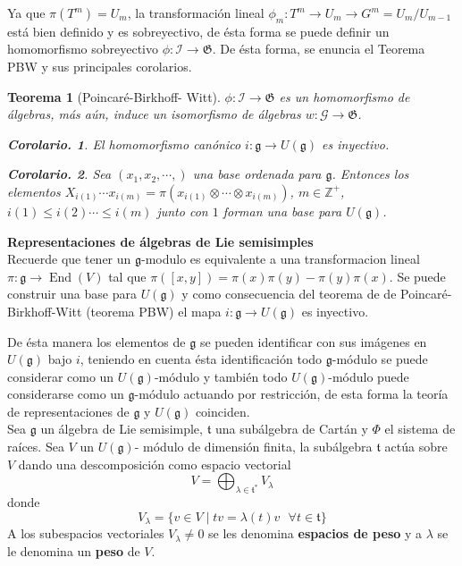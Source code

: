 \documentclass[11pt,a4paper]{article}
\newtheorem{corolary}{Corolario.}
\newtheorem{theorem}{Teorema}
\newcommand{\mfg}{\mathfrak{g}}
\newcommand{\suchthat}{\mid}
\newcommand{\End}{\mathop{End}}
\begin{document}
Ya que $\pi(T^m)= U_m$, la transformación lineal $\phi_m: T^m \rightarrow U_m \rightarrow G^m= U_m /U_{m-1}$ está bien definido y es sobreyectivo, de ésta forma se puede definir un homomorfismo sobreyectivo $\phi: \mathcal{I}\rightarrow \mathfrak{G}$. De ésta forma, se enuncia el Teorema PBW y sus principales corolarios.
\begin{theorem}[Poincaré-Birkhoff- Witt] $\phi: \mathcal{I} \rightarrow \mathfrak{G}$ es un homomorfismo de álgebras, más aún, induce un isomorfismo de álgebras $w: \mathcal{G}\rightarrow \mathfrak{G}$.
\begin{corolary}
El homomorfismo canónico $i: \mfg \rightarrow U(\mfg)$ es inyectivo.
\end{corolary}
\begin{corolary}
Sea $(x_1, x_2, \cdots, )$ una base ordenada para $\mfg$. Entonces los elementos $X_{i(1)}\cdots x_{i(m)}= \pi (x_{i(1)}\otimes \cdots \otimes x_{i(m)})$, $m\in \mathbb{Z}^+$, $i(1)\leq i(2) \cdots \leq i(m)$ junto con $1$ forman una base para $U(\mfg)$.
\end{corolary}

\end{theorem}


\textbf{Representaciones de álgebras de Lie semisimples}\\

Recuerde que tener un $\mfg$-modulo es equivalente a una transformacion lineal $\pi:\mfg\to \End(V)$ tal que $\pi([x,y])=\pi(x)\pi(y)-\pi(y)\pi(x)$. Se puede construir una base para $U(\mfg)$ y como consecuencia del teorema de de Poincaré-Birkhoff-Witt (teorema PBW) el mapa $i:\mfg \to U(\mfg) $ es inyectivo. %

De ésta manera los elementos de $\mfg$ se pueden identificar con sus imágenes en $U(\mfg)$ bajo $i$, teniendo en cuenta  ésta identificación todo $\mfg$-módulo se puede considerar como un $U(\mfg)$-módulo y también todo $U(\mfg)$-módulo  puede considerarse como un $\mfg$-módulo actuando por restricción, de esta forma la teoría de representaciones de $\mfg$ y $U(\mfg)$ coinciden. \\



Sea $\mfg $ un álgebra de Lie semisimple, $\mathfrak{t}$ una subálgebra  de Cartán y $\Phi$ el sistema de raíces. Sea $V$ un $U(\mfg)$- módulo de dimensión finita, la subálgebra $\mathfrak{t}$ actúa sobre $V$ dando una descomposición como espacio vectorial
$$V = \bigoplus_{\lambda \in \mathfrak{t}^*} V_{\lambda}$$
donde $$V_{\lambda}= \{ v\in V \suchthat tv= \lambda(t)v \, \, \, \, \forall t\in \mathfrak{t}\}$$
A los subespacios vectoriales $V_{\lambda}\neq 0$ se les denomina \textbf{espacios de peso} y a $\lambda$ se le denomina un \textbf{peso} de $V$.\\
\end{document}

